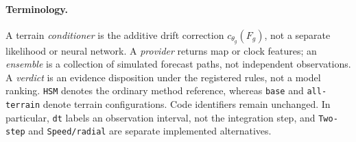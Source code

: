 \paragraph{Terminology.}
A terrain \emph{conditioner} is the additive drift correction
\(c_{\theta_g}(F_g)\), not a separate likelihood or neural network.
A \emph{provider} returns map or clock features; an \emph{ensemble} is a
collection of simulated forecast paths, not independent observations.
A \emph{verdict} is an evidence disposition under the registered rules,
not a model ranking. \texttt{HSM} denotes the ordinary method reference,
whereas \texttt{base} and \texttt{all-terrain} denote terrain configurations.
Code identifiers remain unchanged. In particular, \texttt{dt} labels an
observation interval, not the integration step, and \texttt{Two-step} and
\texttt{Speed/radial} are separate implemented alternatives.
